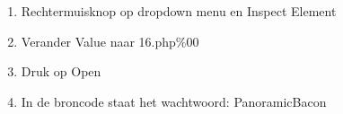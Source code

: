 \begin{enumerate}
  \item Rechtermuisknop op dropdown menu en Inspect Element
  \item Verander Value naar 16.php\%00
  \item Druk op Open
  \item In de broncode staat het wachtwoord: PanoramicBacon
\end{enumerate}